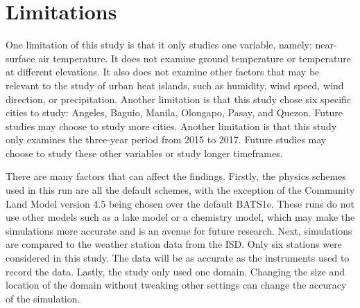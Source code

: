 \section{Limitations}
	One limitation of this study is that it only studies one variable, namely: near-surface air temperature.
	It does not examine ground temperature or temperature at different elevations.
	It also does not examine other factors that may be relevant to the study of urban heat islands, such as humidity, wind speed, wind direction, or precipitation. 
	Another limitation is that this study chose six specific cities to study: Angeles, Baguio, Manila, Olongapo, Pasay, and Quezon.
	Future studies may choose to study more cities.
	Another limitation is that this study only examines the three-year period from 2015 to 2017.
	Future studies may choose to study these other variables or study longer timeframes.
	
	There are many factors that can affect the findings. 
	Firstly, the physics schemes used in this run are all the default schemes, with the exception of the Community Land Model version 4.5 being chosen over the default BATS1e. 
	These runs do not use other models such as a lake model or a chemistry model, which may make the simulations more accurate and is an avenue for future research.
	Next, simulations are compared to the weather station data from the ISD.
	Only six stations were considered in this study.
	The data will be as accurate as the instruments used to record the data.
	Lastly, the study only used one domain.
	Changing the size and location of the domain without tweaking other settings can change the accuracy of the simulation.